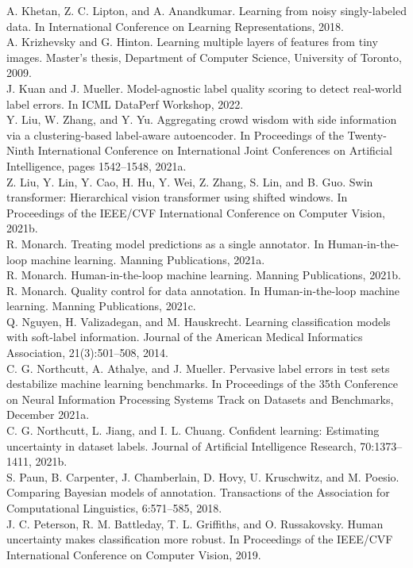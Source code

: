 \documentclass[
]{article}
\begin{document}
A. Khetan, Z. C. Lipton, and A. Anandkumar. Learning from noisy
singly-labeled data. In International Conference on Learning
Representations, 2018.\\
A. Krizhevsky and G. Hinton. Learning multiple layers of features from
tiny images. Master's thesis, Department of Computer Science, University
of Toronto, 2009.\\
J. Kuan and J. Mueller. Model-agnostic label quality scoring to detect
real-world label errors. In ICML DataPerf Workshop, 2022.\\
Y. Liu, W. Zhang, and Y. Yu. Aggregating crowd wisdom with side
information via a clustering-based label-aware autoencoder. In
Proceedings of the Twenty-Ninth International Conference on
International Joint Conferences on Artificial Intelligence, pages
1542--1548, 2021a.\\
Z. Liu, Y. Lin, Y. Cao, H. Hu, Y. Wei, Z. Zhang, S. Lin, and B. Guo.
Swin transformer: Hierarchical vision transformer using shifted windows.
In Proceedings of the IEEE/CVF International Conference on Computer
Vision, 2021b.\\
R. Monarch. Treating model predictions as a single annotator. In
Human-in-the-loop machine learning. Manning Publications, 2021a.\\
R. Monarch. Human-in-the-loop machine learning. Manning Publications,
2021b.\\
R. Monarch. Quality control for data annotation. In Human-in-the-loop
machine learning. Manning Publications, 2021c.\\
Q. Nguyen, H. Valizadegan, and M. Hauskrecht. Learning classification
models with soft-label information. Journal of the American Medical
Informatics Association, 21(3):501--508, 2014.\\
C. G. Northcutt, A. Athalye, and J. Mueller. Pervasive label errors in
test sets destabilize machine learning benchmarks. In Proceedings of the
35th Conference on Neural Information Processing Systems Track on
Datasets and Benchmarks, December 2021a.\\
C. G. Northcutt, L. Jiang, and I. L. Chuang. Confident learning:
Estimating uncertainty in dataset labels. Journal of Artificial
Intelligence Research, 70:1373--1411, 2021b.\\
S. Paun, B. Carpenter, J. Chamberlain, D. Hovy, U. Kruschwitz, and M.
Poesio. Comparing Bayesian models of annotation. Transactions of the
Association for Computational Linguistics, 6:571--585, 2018.\\
J. C. Peterson, R. M. Battleday, T. L. Griffiths, and O. Russakovsky.
Human uncertainty makes classification more robust. In Proceedings of
the IEEE/CVF International Conference on Computer Vision, 2019.
\end{document}
